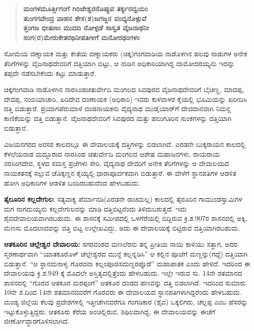 \begin{verse}
\textbf{ಮಂಗಳಮೂರ್ತ್ತಿಗಂಗೆ ಗಿರಿಜೇಶ್ವರನೊಪ್ಪುವ ತರ್ಕ್ಯನದ್ವಯಂ} \\\textbf{ತುಂಗಗವೇಂದ್ರ ವಾಹನ ಶೇಸ(ಶ)ಜಗಜ್ಜನ ವಂದ್ಯನೊಳ್ಪುವೆ} \\\textbf{ತ್ತಂಗಜ ಭೀಷಣಂ ಮುದದಿ ನೋಳ್ಪಡೆ ಸಾಸ್ವತ ವೈಜನಾಥನೀ} \\\textbf{ಸಂಗ(ರ)ಮೇರುಕೇತರಥಿನೀಪತಿಗೀಗೆ ಮನೋರಥಂಗಳಂ }
\end{verse}

ಸೋಮೆಯ ದಣ್ನಾಯಕ ಮತ್ತು ಕೇತೆಯ ದಣ್ನಾಯಕರು (ಚಿಕ್ಕ)ಗಂಗವಾಡಿಯ ನಾಡೊಳಗಿನ ಹಲವು ನಾಡುಗಳ ಅನೇಕ ತೆರಿಗೆಗಳನ್ನು ವೈಜನಾಥದೇವರಿಗೆ ದತ್ತಿಯಾಗಿ ಬಿಟ್ಟು, ಆ ನಾಡಿನ ಅಧಿಕಾರಿಯಾಗಿದ್ದ ದಾಮೋದರಯ್ಯನು ಇದನ್ನು ತಪ್ಪದೇ ನಡೆಸಬೇಕೆಂದು ಕಟ್ಟು ಮಾಡುತ್ತಾರೆ.

ಚಿಕ್ಕಗಂಗವಾಡಿ ನಾಡೊಳಗಿನ ನಾರಸಿಂಹಚತುರ್ವೇದಿ ಮಂಗಲದ ಸಿವಪುರದ ವೈಜನಾಥದೇವರಿಗೆ ಬೈಚಣ್ಣ, ಮಾದಪ್ಪ, ದೇವಪ್ಪ, ನಂಬಿಯಾಚಾರಿ, ಹಿರಿದೇವ ದಂಣಾಯಕ (ಅಧಿಕಾರಿ) ಇವರು ಕುಳವಾಳರ ಕೈಯಲ್ಲಿ ಭೂಮಿಯನ್ನು ಖರೀದಿಸಿ ದತ್ತಿ ಬಿಡುತ್ತಾರೆ. ಪ್ರಯಾಗಪೆರುಮಾಳೆ ದಂಡನಾಯಕನು ವೈದ್ಯನಾಥ ಮುಡೈಯಾರ್​ಗೆ ದೇವದಾನವಾಗಿ ನಿಮನ್ದ ಕಾಣಿಕೆಯನ್ನು ದತ್ತಿ ಬಿಡುತ್ತಾನೆ. ವೈಜನಾಥದೇವರಿಗೆ ಸಿವಪುರದ ಮತ್ತು ಹಲುಗೂರಿನ ಸುಂಕಗಳನ್ನು ದತ್ತಿಯಾಗಿ ಬಿಡುತ್ತಾನೆ.

ವಿಜಯನಗರದ ಅರಸರ ಕಾಲದಲ್ಲೂ ಈ ದೇವಾಲಯಕ್ಕೆ ದತ್ತಿಗಳನ್ನು ಬಿಡಲಾಗಿದೆ. ಎರಡನೇ ಬುಕ್ಕರಾಯನ ಕಾಲದಲ್ಲಿ ಕೆಳಲೆಯನಾಡ ಮದ್ದೂರಾದ ನಾರಸಿಂಹ ಚತುರ್ವೇದಿ ಮಂಗಲದ ಆಶೇಷ ಮಹಾಜನಗಳು, ರಾಯರಾಯ ನರಸಿಂಗದೇವ, ಸ್ಥಳದ ಸಮಸ್ತ ಪ್ರಜೆಗಳು ಸೇರಿ, ವೈದ್ಯನಾಥ ದೇವರಿಗೆ ಅನೇಕ ತೆರಿಗೆಗಳನ್ನು ಆ ದೇವಾಲಯದ ನಾಯಕತನಕ್ಕೆ ಸಲ್ಲುವ ಚೊಕ್ಕಣ್ಣನ ಕೈಯ್ಯಲ್ಲಿ ಧಾರಾಪೂರ್ವಕವಾಗಿ ಬಿಡುತ್ತಾರೆ. ಈ ವೇಳೆಗೆ ಸ್ಥಾನಪತಿಗಳ ಆಡಳಿತ ಹೋಗಿ ಅಧಿಕಾರಿಗಳ ಆಡಳಿತ ಬಂದಿರಬಹುದೆಂದ ಹೇಳಬಹುದು.

\textbf{ತೈಲೂರಿನ ಕಲ್ಲದೇಗುಲ: } ಸತ್ಯವಾಕ್ಯ ಪೆರ್ಮಾನಡಿ(ಎರಡನೇ ರಾಚಮಲ್ಲ) ಕಾಲದಲ್ಲಿ ತೈರೂರಿನ ಗಾಮುಂಡಸ್ವಾಮಿಗಳ ಮಗ ನಾಗಮಯ್ಯನು ಕಲ್ಲದೇಗುಲವನ್ನು ಮಾಡಿ ದತ್ತಿಬಿಟ್ಟನೆಂದು ತಿಳಿದುಬರುತ್ತದೆ. ಇದು ಶೈವದೇವಾಲಯವಾಗಿರಬಹುದು. ಈ ಶಾಸನಕ್ಕೆ ಸಮೀಪದಲ್ಲಿ ಒಳಗೆರೆಯಲ್ಲಿ ಬಿದ್ದಿರುವ ಕ್ರಿ.ಶ.907ರ ಶಾಸನದಲ್ಲಿ ಅಕ್ಕಿ, ಮೆಣಸು ಮೊದಲಾದವನ್ನು ದತ್ತಿ ಬಿಟ್ಟ ಉಲ್ಲೇಖವಿದ್ದು, ಅದು ಈ ದೇವಾಲಯಕ್ಕೆ ಬಿಟ್ಟಿರುವ ದತ್ತಿಯಾಗಿರಬಹುದು.

\textbf{ಆತಕೂರಿನ ಚಲ್ಲೇಶ್ವರ ದೇವಾಲಯ:} ಸಗರವಂಶದ ಮಣಲೆರನು ತನ್ನ ಪ್ರೀತಿಯ ನಾಯಿ ಕಾಳಿಯು ಸತ್ತಾಗ, ಅದರ ಸ್ಮರಣಾರ್ಥವಾಗಿ “ಯಾತಕೂರೊಳ್​ ಚೆಲ್ಲೇಶ್ವರದ ಮುನ್ದೆ ಕಲ್ಲನ್ನಡಿಸಿ” ಆ ಕಲ್ಲಿನ ಪೂಜೆಗೆ ಮಣ್ಣನ್ನು(ಗದ್ದೆ) ದತ್ತಿಯಾಗಿ ಬಿಡುತ್ತಾನೆ. “ಆ ಸ್ಥಾನಮನಾಳ್ವ ಗೊರವನಾ ಕಲ್ಲಂಪೂಜಿಸದುಣ್ಡರಪ್ಪೊಡೆ” ಮಹಾಪಾತಕ ಎಂದು ಹೇಳಿದೆ. ಇದರಿಂದ ಈ ದೇವಾಲಯವು ಕ್ರಿ.ಶ.949 ಕ್ಕೆ ಮೊದಲೇ ಅಸ್ತಿತ್ವದಲ್ಲಿತ್ತೆಂದು ಹೇಳಬಹುದು. ಇಲ್ಲೇ ಇರುವ ಸು. 14ನೇ ಶತಮಾನದ ಶಾಸನದಲ್ಲಿ “ಗೊರವ ಆತಕೂರ ಮರಪ್ಪಂಗೆ” ಆತಕೂರ ದಂಡದ ಹಣವನ್ನು ದತ್ತಿ ಬಿಡಲಾಗಿದೆ. ಇದರಿಂದ ಸುಮಾರು 10ನೇ ಶ.ದಿಂದ 14ನೇ ಶತಮಾನದವರೆಗೆ ಗೊರವರು ಈ ದೇವಾಲಯದ ಸ್ಥಾನಪತಿಗಳಾಗಿದ್ದರೆಂದು ಹೇಳಬಹುದು. ಮಂಡ್ಯ ಜಿಲ್ಲೆಯ ಕೆಲವು ಪ್ರದೇಶಗಳಲ್ಲಿ ಇತ್ತೀಚೆಗಿನವರೆಗೂ ಗಂಗಡಿಕಾರ (ಶೈವ) ಒಕ್ಕಲಿಗರು, ಚೆಲ್ಲಪ್ಪ ಎಂಬ ಹೆಸರನ್ನು ಇಟ್ಟುಕೊಳ್ಳುತ್ತಿದ್ದರು. ಆತಕೂರು ಕೆರೆಯ ಅಂಚಿಲ್ಲಿರುವ, ಶಿಥಿಲವಾಗಿದ್ದ, ಈ ದೇವಾಲಯವನ್ನು ಈಚೆಗೆ ಜೀರ್ಣೋದ್ಧಾರಗೊಳಿಸಲಾಗಿದೆ.

